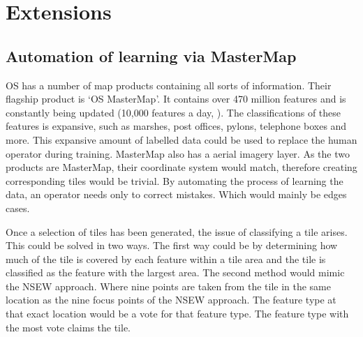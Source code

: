 \section{Extensions}
\subsection{Automation of learning via MasterMap}
OS has a number of map products containing all sorts of information. Their flagship product is `OS MasterMap'. It contains over 470 million features and is constantly being updated (10,000 features a day, \cite{OS:Youtube}). The classifications of these features is expansive, such as marshes, post offices, pylons, telephone boxes and more. This expansive amount of labelled data could be used to replace the human operator during training. MasterMap also has a aerial imagery layer. As the two products are MasterMap, their coordinate system would match, therefore creating corresponding tiles would be trivial. By automating the process of learning the data, an operator needs only to correct mistakes. Which would mainly be edges cases.

Once a selection of tiles has been generated, the issue of classifying a tile arises. This could  be solved in two ways. The first way could be by determining how much of the tile is covered by each feature within a tile area and the tile is classified as the feature with the largest area. The second method would mimic the NSEW approach. Where nine points are taken from the tile in the same location as the nine focus points of the NSEW approach. The feature type at that exact location would be a vote for that feature type. The feature type with the most vote claims the tile.

